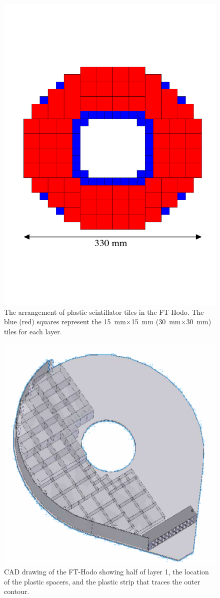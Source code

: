 \begin{figure}[th!]
\centering 
\includegraphics[width=0.85\columnwidth]{./fig/FTHodoLayout.pdf} 
\caption{The arrangement of plastic scintillator tiles in the FT-Hodo. The blue (red) squares represent the
  15~mm$\times$15~mm (30~mm$\times$30~mm) tiles for each layer.} 
\label{Fig:FTHodoLayout} 
\end{figure}

\begin{figure}[th!]
\centering 
\includegraphics[width=0.85\columnwidth]{./fig/CADFT-Hodo.pdf} 
\caption{CAD drawing of the FT-Hodo showing half of layer 1, the location of the plastic spacers, and the plastic
  strip that traces the outer contour. } 
\label{Fig:CADFT-Hodo} 
\end{figure}

